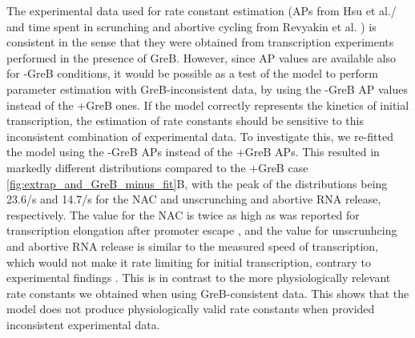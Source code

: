 The experimental data used for rate constant estimation (APs from Hsu et al./
\cite{hsu_initial_2006} and time spent in scrunching and abortive cycling from
Revyakin et al. \cite{revyakin_abortive_2006}) is consistent in the sense that
they were obtained from transcription experiments performed in the presence of
GreB. However, since AP values are available also for -GreB conditions, it
would be possible as a test of the model to perform parameter estimation with
GreB-inconsistent data, by using the -GreB AP values instead of the +GreB
ones. If the model correctly represents the kinetics of initial transcription,
the estimation of rate constants should be sensitive to this inconsistent
combination of experimental data. To investigate this, we re-fitted the model using
the -GreB APs instead of the +GreB APs. This resulted in markedly different
distributions compared to the +GreB case \ref{fig:extrap_and_GreB_minus_fit}B,
with the peak of the distributions being 23.6/s and 14.7/s for
the NAC and unscrunching and abortive RNA release, respectively. The value for
the NAC is twice as high as was reported for transcription elongation after
promoter escape \cite{revyakin_abortive_2006}, and the value for unscrunhcing
and abortive RNA release is similar to the measured speed of transcription,
which would not make it rate limiting for initial transcription, contrary to
experimental findings \cite{revyakin_abortive_2006, margeat_direct_2006}. This
is in contrast to the more physiologically relevant rate constants we obtained
when using GreB-consistent data. This shows that the model does not produce
physiologically valid rate constants when provided inconsistent experimental
data.
